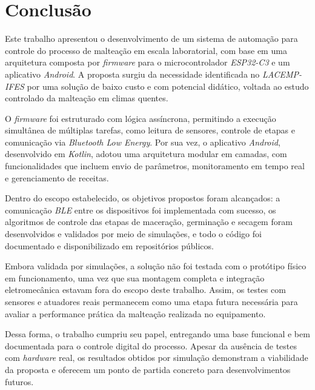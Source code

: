 \chapter[Conclusão]{Conclusão}

Este trabalho apresentou o desenvolvimento de um sistema de automação para controle do processo de malteação em escala laboratorial, com base em uma arquitetura composta por \textit{firmware} para o microcontrolador \textit{ESP32-C3} e um aplicativo \textit{Android}. A proposta surgiu da necessidade identificada no \textit{LACEMP-IFES} por uma solução de baixo custo e com potencial didático, voltada ao estudo controlado da malteação em climas quentes.

O \textit{firmware} foi estruturado com lógica assíncrona, permitindo a execução simultânea de múltiplas tarefas, como leitura de sensores, controle de etapas e comunicação via \textit{Bluetooth Low Energy}. Por sua vez, o aplicativo \textit{Android}, desenvolvido em \textit{Kotlin}, adotou uma arquitetura modular em camadas, com funcionalidades que incluem envio de parâmetros, monitoramento em tempo real e gerenciamento de receitas.

Dentro do escopo estabelecido, os objetivos propostos foram alcançados: a comunicação \textit{BLE} entre os dispositivos foi implementada com sucesso, os algoritmos de controle das etapas de maceração, germinação e secagem foram desenvolvidos e validados por meio de simulações, e todo o código foi documentado e disponibilizado em repositórios públicos.

Embora validada por simulações, a solução não foi testada com o protótipo físico em funcionamento, uma vez que sua montagem completa e integração eletromecânica estavam fora do escopo deste trabalho. Assim, os testes com sensores e atuadores reais permanecem como uma etapa futura necessária para avaliar a performance prática da malteação realizada no equipamento.

Dessa forma, o trabalho cumpriu seu papel, entregando uma base funcional e bem documentada para o controle digital do processo. Apesar da ausência de testes com \textit{hardware} real, os resultados obtidos por simulação demonstram a viabilidade da proposta e oferecem um ponto de partida concreto para desenvolvimentos futuros.